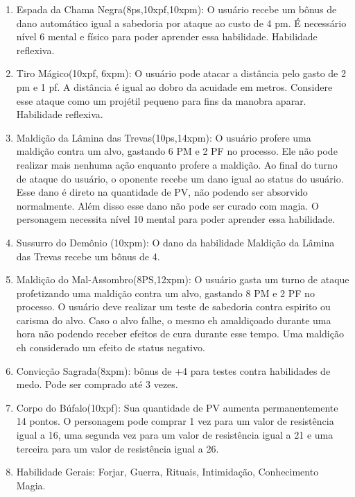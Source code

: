 \begin{enumerate}
  	\item Espada da Chama Negra(8ps,10xpf,10xpm): O usuário recebe um bônus de dano automático igual a sabedoria por ataque ao custo de 4 pm. É necessário nível 6 mental e físico para poder aprender essa habilidade. Habilidade reflexiva.
  
  	\item Tiro Mágico(10xpf, 6xpm): O usuário pode atacar a distância pelo gasto de 2 pm e 1 pf. A distância é igual ao dobro da acuidade em metros. Considere esse ataque como um projétil pequeno para fins da manobra aparar. Habilidade reflexiva.
    
  	\item Maldição da Lâmina das Trevas(10ps,14xpm): O usuário profere uma maldição contra um alvo, gastando 6 PM e 2 PF no processo. Ele não pode realizar mais nenhuma ação enquanto profere a maldição. Ao final do turno de ataque do usuário, o oponente recebe um dano igual ao status do usuário. Esse dano é direto na quantidade de PV, não podendo ser absorvido normalmente. Além disso esse dano não pode ser curado com magia. O personagem necessita nível 10 mental para poder aprender essa habilidade.

  \item Sussurro do Demônio (10xpm): O dano da habilidade Maldição da Lâmina das Trevas recebe um bônus de 4.

\item Maldição do Mal-Assombro(8PS,12xpm): O usuário gasta um turno de ataque profetizando uma maldição contra um alvo, gastando 8 PM e 2 PF no processo. O usuário deve realizar um teste de sabedoria contra espirito ou carisma do alvo. Caso o alvo falhe, o mesmo eh amaldiçoado durante uma hora não podendo receber efeitos de cura durante esse tempo. Uma maldição eh considerado um efeito de status negativo.

\item Convicção Sagrada(8xpm): bônus de +4 para testes contra habilidades de medo. Pode ser comprado até 3 vezes.

\item Corpo do Búfalo(10xpf): Sua quantidade de PV aumenta permanentemente 14 pontos. O personagem pode comprar 1 vez para um valor de resistência igual a 16, uma segunda vez para um valor de resistência igual a 21 e uma terceira para um valor de resistência igual a 26.
	

	\item Habilidade Gerais: Forjar, Guerra, Rituais, Intimidação, Conhecimento Magia.
  
\end{enumerate}

